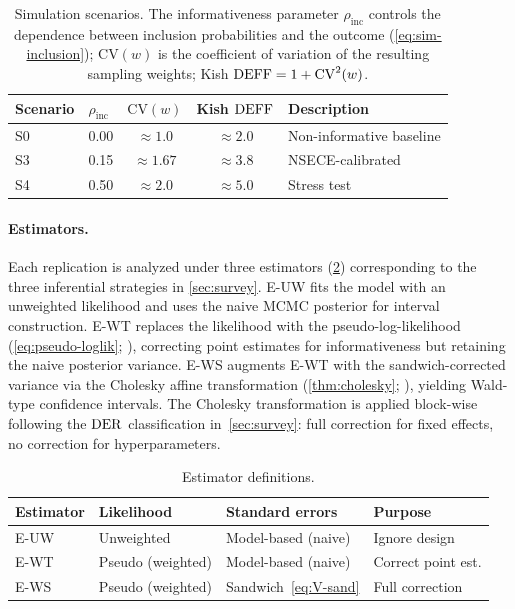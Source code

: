 \begin{table}[t]
\centering
\caption{Simulation scenarios. The informativeness parameter
  $\rho_{\mathrm{inc}}$ controls the dependence between inclusion
  probabilities and the outcome (\cref{eq:sim-inclusion});
  $\mathrm{CV}(w)$ is the coefficient of variation of the resulting
  sampling weights; Kish $\text{DEFF} = 1 + \mathrm{CV}^2(w)$.}\label{tab:sim-scenarios}
\smallskip
\begin{tabular}{@{}llccl@{}}
\toprule
Scenario & $\rho_{\mathrm{inc}}$ & $\mathrm{CV}(w)$ &
  Kish $\text{DEFF}$ & Description \\
\midrule
S0 & 0.00 & $\approx 1.0$ & $\approx 2.0$ & Non-informative baseline \\
S3 & 0.15 & $\approx 1.67$ & $\approx 3.8$ & NSECE-calibrated \\
S4 & 0.50 & $\approx 2.0$  & $\approx 5.0$ & Stress test \\
\bottomrule
\end{tabular}
\end{table}

\paragraph{Estimators.}
Each replication is analyzed under three estimators (\cref{tab:sim-estimators})
corresponding to the three inferential strategies in
\cref{sec:survey}. E-UW fits the model with an unweighted likelihood and
uses the naive MCMC posterior for interval construction. E-WT replaces
the likelihood with the pseudo-log-likelihood
(\cref{eq:pseudo-loglik}; \citealp{SavitskyToth2016}),
correcting point estimates for informativeness but retaining the
naive posterior variance. E-WS augments E-WT with the
sandwich-corrected variance via the Cholesky affine transformation
(\cref{thm:cholesky}; \citealp{WilliamsSavitsky2021}), yielding
Wald-type confidence intervals.
The Cholesky transformation is applied block-wise following the $\operatorname{DER}$
classification in~\cref{sec:survey}: full correction for fixed effects,
no correction for hyperparameters.

\begin{table}[t]
\centering
\caption{Estimator definitions.}\label{tab:sim-estimators}
\smallskip
\small
\begin{tabular}{@{}lp{2.5cm}p{3.5cm}l@{}}
\toprule
Estimator & Likelihood & Standard errors & Purpose \\
\midrule
E-UW & Unweighted         & Model-based (naive) & Ignore design \\
E-WT & Pseudo (weighted)  & Model-based (naive) & Correct point est. \\
E-WS & Pseudo (weighted)  & Sandwich~\eqref{eq:V-sand} & Full correction \\
\bottomrule
\end{tabular}
\end{table}

